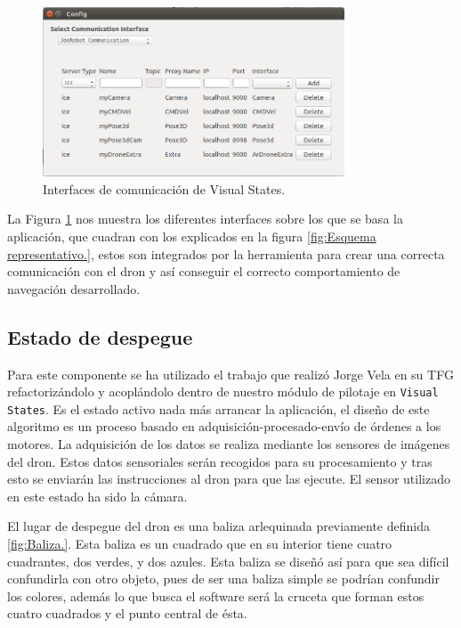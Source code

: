 \begin{figure}[H]
	\begin{center}
		\includegraphics[width=0.8\textwidth]{imag/IMG70.png}
				\caption{Interfaces de comunicación de Visual States.}
		\label{fig:Esquema interfaces VisualStates.}	
	\end{center}
\end{figure}

La Figura \ref{fig:Esquema interfaces VisualStates.} nos muestra los diferentes interfaces sobre los que se basa la aplicación, que cuadran con los explicados en la figura \ref{fig:Esquema representativo.}, estos son integrados por la herramienta para crear una correcta comunicación con el dron y así conseguir el correcto comportamiento de navegación desarrollado. 

\subsection{Estado de despegue}
\hspace{1cm} Para este componente se ha utilizado el trabajo que realizó Jorge Vela en su TFG \cite{JorgeVela} refactorizándolo y acoplándolo dentro de nuestro módulo de pilotaje en \texttt{Visual States}. Es el estado activo nada más arrancar la aplicación, el diseño de este algoritmo es un proceso basado en adquisición-procesado-envío de órdenes a los motores. La adquisición de los datos se realiza mediante los sensores de imágenes del dron. Estos datos sensoriales serán recogidos para su procesamiento y tras esto se enviarán las instrucciones al dron para que las ejecute. El sensor utilizado en este estado ha sido la cámara.

\hspace{1cm} El lugar de despegue del dron es una baliza arlequinada previamente definida \ref{fig:Baliza.}. Esta baliza es un cuadrado que en su interior tiene cuatro cuadrantes, dos verdes, y dos azules. Esta baliza se diseñó así para que sea difícil confundirla con otro objeto, pues de ser una baliza simple se podrían confundir los colores, además lo que busca el software será la cruceta que forman estos cuatro cuadrados y el punto central de ésta.

